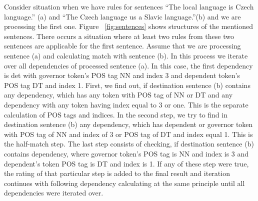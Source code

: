\documentclass{iitsrc}
\begin{document}
		Consider situation when we have rules for sentences ``The local language is Czech language.'' (a) and ``The Czech language us a Slavic language.''(b) and we are processing the first one. Figure ~\ref{fig:sentences} shows structures of the mentioned sentences. There occurs a situation where at least two rules from these two sentences are applicable for the first sentence. Assume that we are processing sentence (a) and calculating match with sentence (b). In this process we iterate over all dependencies of processed sentence (a). In this case, the first dependency is det with governor token's POS tag NN and index 3 and dependent token's POS tag DT and index 1. First, we find out, if destination sentence (b) contains any dependency, which has any token with POS tag of NN or DT and any dependency with any token having index equal to 3 or one. This is the separate calculation of POS tags and indices. In the second step, we try to find in destination sentence (b) any dependency, which has dependent or governor token with POS tag of NN and index of 3 or POS tag of DT and index equal 1. This is the half-match step. The last step consists of checking, if destination sentence (b) contains dependency, where governor token's POS tag is NN and index is 3 and dependent's token POS tag is DT and index is 1. If any of these step were true, the rating of that particular step is added to the final result and iteration continues with following dependency calculating at the same principle until all dependencies were iterated over.
%
%	
\end{document}

